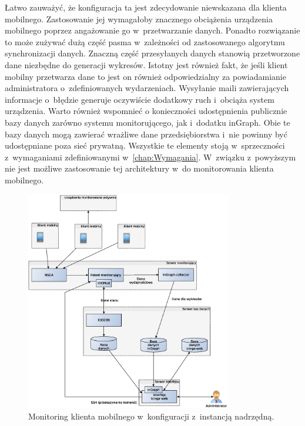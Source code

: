 Łatwo zauważyć, że konfiguracja ta jest zdecydowanie niewskazana dla
klienta mobilnego. Zastosowanie jej wymagałoby znacznego obciążenia
urządzenia mobilnego poprzez angażowanie go w~przetwarzanie
danych. Ponadto rozwiązanie to może zużywać dużą część pasma
w~zależności od zastosowanego algorytmu synchronizacji danych. Znaczną
część przesyłanych danych stanowią przetworzone dane niezbędne do
generacji wykresów. Istotny jest również fakt, że jeśli klient mobilny
przetwarza dane to jest on również odpowiedzialny za powiadamianie
administratora o~zdefiniowanych wydarzeniach. Wysyłanie maili
zawierających informacje o~błędzie generuje oczywiście dodatkowy ruch
i~obciąża system urządzenia. Warto również wspomnieć o konieczności
udostępnienia publicznie bazy danych zarówno systemu monitorującego,
jak i~dodatku inGraph. Obie te bazy danych mogą zawierać wrażliwe dane
przedsiębiorstwa i~nie powinny być udostępniane poza sieć
prywatną. Wszystkie te elementy stoją w~sprzeczności z~wymaganiami
zdefiniowanymi w~\ref{chap:Wymagania}. W~związku z~powyższym nie jest
możliwe zastosowanie tej architektury w~do monitorowania klienta
mobilnego.

\begin{figure}[ht]
  \centering
  \caption{Monitoring klienta mobilnego w~konfiguracji z~instancją
    nadrzędną.}
  \label{fig:mobilnyInstancja}
\includegraphics[width=0.80\textwidth]{img/mobilnyInstancja}
\end{figure}

